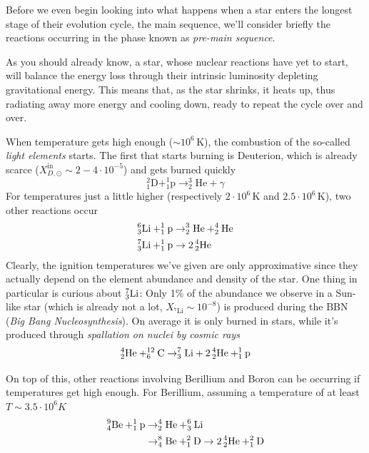 Before we even begin looking into what happens when a star enters the longest stage of their evolution cycle, the main sequence, we'll consider briefly the reactions occurring in the phase known as \emph{pre-main sequence}.
\par As you should already know, a star, whose nuclear reactions have yet to start, will balance the energy loss through their intrinsic luminosity depleting gravitational energy. This means that, as the star shrinks, it heats up, thus radiating away more energy and cooling down, ready to repeat the cycle over and over.
\par When temperature gets high enough ($\sim 10^{6}\,\text{K}$), the combustion of the so-called \emph{light elements} starts. The first that starts burning is Deuterion, which is already scarce ($X_{D,\odot}^{\text{in}}\sim 2-4\cdot 10^{-5}$) and gets burned quickly
\begin{equation*}
    ^{2}_{1}\text{D} + ^{1}_{1}\text{p} \to ^{3}_{2}\text{He} + \gamma
\end{equation*}
For temperatures just a little higher (respectively $2\cdot 10^{6}\,\text{K}$ and $2.5\cdot 10^{6}\,\text{K}$), two other reactions occur
\begin{align*}
    \element{Li}{6}{3}+\element{p}{1}{1}&\to\element{He}{3}{2}+\element{He}{4}{2}\\
    \element{Li}{7}{3}+\element{p}{1}{1}&\to 2\,\element{He}{4}{2}
\end{align*}
Clearly, the ignition temperatures we've given are only approximative since they actually depend on the element abundance and density of the star. One thing in particular is curious about $\element{Li}{7}{3}$: Only 1\% of the abundance we observe in a Sun-like star (which is already not a lot, $X_{^{7}\text{Li}}\sim 10^{-8}$) is produced during the BBN (\emph{Big Bang Nucleosynthesis}). On average it is only burned in stars, while it's produced through \emph{spallation on nuclei by cosmic rays}
\begin{equation*}
    \element{He}{4}{2}+\element{C}{12}{6}\to \element{Li}{7}{3}+2\,\element{He}{4}{2}+\element{p}{1}{1}
\end{equation*}
\par On top of this, other reactions involving Berillium and Boron can be occurring if temperatures get high enough. For Berillium, assuming a temperature of at least $T\sim 3.5\cdot 10^{6}\unit{K}$
\begin{align*}
    \element{Be}{9}{4}+\element{p}{1}{1}&\to\element{He}{4}{2}+\element{Li}{6}{3}\\
    &\to \element{Be}{8}{4}+\element{D}{2}{1}\to 2\,\element{He}{4}{2}+\element{D}{2}{1}
\end{align*}

